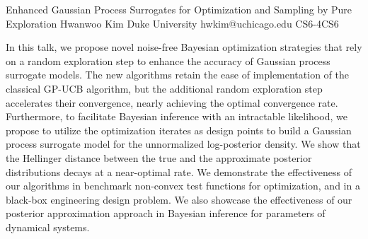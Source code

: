 \begin{talk}
  {Enhanced Gaussian Process Surrogates for Optimization and Sampling by Pure Exploration}%
  {Hwanwoo Kim}%
  {Duke University}%
  {hwkim@uchicago.edu}%
{} %
{}{}{CS6-4}{CS6}



In this talk, we propose novel noise-free Bayesian optimization strategies that rely on a random exploration step to enhance the accuracy of Gaussian process surrogate models. The new algorithms retain the ease of implementation of the classical GP-UCB algorithm, but the additional random exploration step accelerates their convergence, nearly achieving the optimal convergence rate. Furthermore, to facilitate Bayesian inference with an intractable likelihood, we propose to utilize the optimization iterates as design points to build a Gaussian process surrogate model for the unnormalized log-posterior density. We show that the Hellinger distance between the true and the approximate posterior distributions decays at a near-optimal rate. We demonstrate the effectiveness of our algorithms in benchmark non-convex test functions for optimization, and in a black-box engineering design problem. We also showcase the effectiveness of our posterior approximation approach in Bayesian inference for parameters of dynamical systems.

\end{talk}

